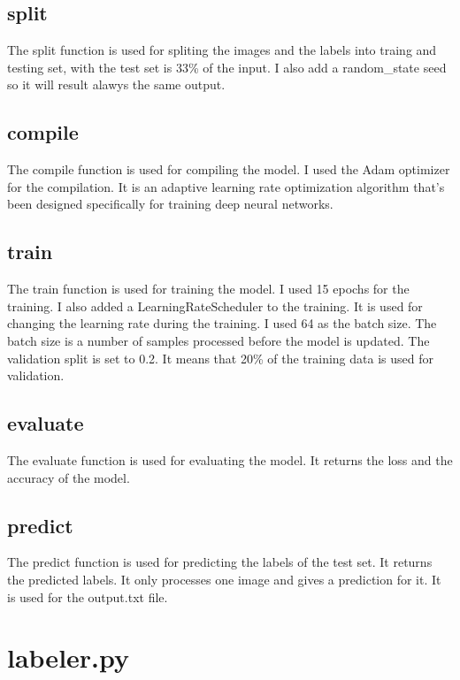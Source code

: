 \documentclass[11pt,a4paper,oneside]{report}
\begin{document}
\subsection{split}
The split function is used for spliting the images and the labels into traing and testing set, with the test set is 33\% of the input.
I also add a random\_state seed so it will result alawys the same output.

\subsection{compile}

The compile function is used for compiling the model. I used the Adam optimizer for the compilation.
It is an adaptive learning rate optimization algorithm that’s been designed specifically for training deep neural networks.

\subsection{train}

The train function is used for training the model. I used 15 epochs for the training.
I also added a LearningRateScheduler to the training. It is used for changing the learning rate during the training.
I used 64 as the batch size. The batch size is a number of samples processed before the model is updated.
The validation split is set to 0.2. It means that 20\% of the training data is used for validation.

\subsection{evaluate}

The evaluate function is used for evaluating the model. It returns the loss and the accuracy of the model.

\subsection{predict}

The predict function is used for predicting the labels of the test set. It returns the predicted labels.
It only processes one image and gives a prediction for it. It is used for the output.txt file.

\section{labeler.py}
\end{document}
